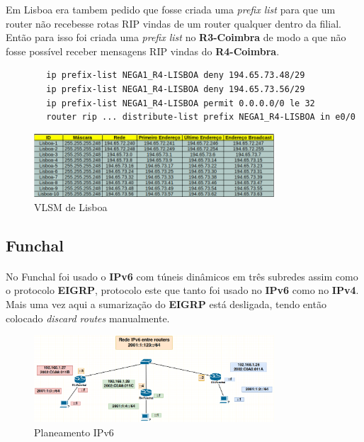 \documentclass[11pt]{article}
\begin{document}
	Em Lisboa era tambem pedido que fosse criada uma \emph{prefix list} para que um router não recebesse rotas RIP vindas de um router qualquer dentro da filial. Então para isso foi criada uma \emph{prefix list} no \textbf{R3-Coimbra} de modo a que não fosse possível receber mensagens RIP vindas do \textbf{R4-Coimbra}.

	\begin{lstlisting}
		ip prefix-list NEGA1_R4-LISBOA deny 194.65.73.48/29
		ip prefix-list NEGA1_R4-LISBOA deny 194.65.73.56/29
		ip prefix-list NEGA1_R4-LISBOA permit 0.0.0.0/0 le 32
		router rip ... distribute-list prefix NEGA1_R4-LISBOA in e0/0
	\end{lstlisting}

	\begin{figure}[h]
		\centering
		\includegraphics[width=0.8\textwidth]{vlsm-lisboa}
		\caption{VLSM de Lisboa}
		\label{fig.nav}
	\end{figure}


	\subsection{Funchal}
	\normalsize
	\paragraph{}
	No Funchal foi usado o \textbf{IPv6} com túneis dinâmicos em três subredes assim como o protocolo \textbf{EIGRP}, protocolo este que tanto foi usado no \textbf{IPv6} como no \textbf{IPv4}. Mais uma vez aqui a sumarização do \textbf{EIGRP} está desligada, tendo então colocado \emph{discard routes} manualmente.

	\begin{figure}[h]
		\centering
		\includegraphics[width=0.8\textwidth]{ipv6}
		\caption{Planeamento IPv6}
		\label{fig.nav}
	\end{figure}
\end{document}
